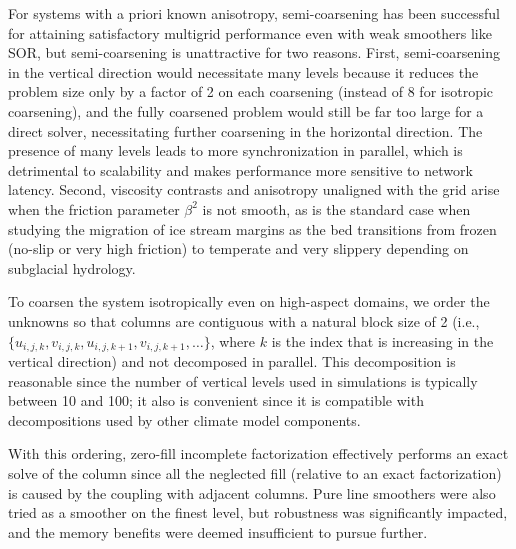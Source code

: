 \documentclass[draft,lineno,jgrga]{AGUTeX}
\begin{document}
\begin{article}
For systems with a priori known anisotropy, semi-coarsening has been successful for attaining
satisfactory multigrid performance even with weak smoothers like SOR, but semi-coarsening is
unattractive for two reasons.  First, semi-coarsening in the vertical direction would necessitate
many levels because it reduces the problem size only by a factor of 2 on each coarsening (instead of
8 for isotropic coarsening), and the fully coarsened problem would still be far too large for a
direct solver, necessitating further coarsening in the horizontal direction.  The presence of many
levels leads to more synchronization in parallel, which is detrimental to scalability and makes
performance more sensitive to network latency.  Second, viscosity contrasts and anisotropy
unaligned with the grid arise when the friction parameter $\beta^2$ is not smooth, as is the standard
case when studying the migration of ice stream margins as the bed transitions from frozen (no-slip
or very high friction) to temperate and very slippery depending on subglacial hydrology.

To coarsen the system isotropically even on high-aspect domains, we order the unknowns so that columns
are contiguous with a natural block size of 2
(i.e., $\{u_{i,j,k},v_{i,j,k},u_{i,j,k+1},v_{i,j,k+1},\dotsc\}$, where $k$ is the index that is
increasing in the vertical direction) and not decomposed in parallel.  This decomposition is
reasonable since the number of vertical levels used in simulations is typically between 10 and 100;
it also is convenient since it is compatible with decompositions used by other climate model components.

With this ordering, zero-fill incomplete factorization effectively performs an exact solve of the
column since all the neglected fill (relative to an exact factorization) is caused by the coupling
with adjacent columns.  Pure line smoothers were also tried as a smoother on the finest level, but
robustness was significantly impacted, and the memory benefits were deemed insufficient to pursue
further.


\end{article}
\end{document}
